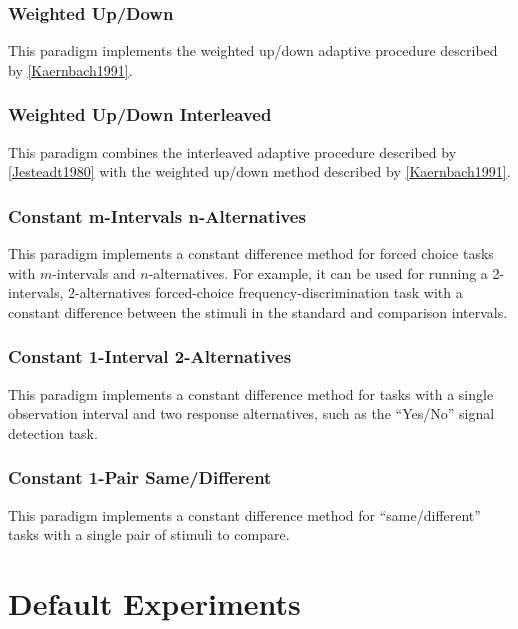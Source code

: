 \documentclass[a4paper,12pt,english]{sphinxmanual}
\begin{document}
\subsection{Weighted Up/Down}
\label{psychophysics:weighted-up-down}
This paradigm implements the weighted up/down adaptive procedure
described by {\hyperref[references:kaernbach1991]{{[}Kaernbach1991{]}}}.


\subsection{Weighted Up/Down Interleaved}
\label{psychophysics:weighted-up-down-interleaved}
This paradigm combines the interleaved adaptive procedure described by {\hyperref[references:jesteadt1980]{{[}Jesteadt1980{]}}} with the weighted up/down method described by {\hyperref[references:kaernbach1991]{{[}Kaernbach1991{]}}}.


\subsection{Constant m-Intervals n-Alternatives}
\label{psychophysics:constant-m-intervals-n-alternatives}
This paradigm implements a constant difference method for forced choice
tasks with $m$-intervals and $n$-alternatives. For example,
it can be used for running a 2-intervals, 2-alternatives forced-choice
frequency-discrimination task with a constant difference between the
stimuli in the standard and comparison intervals.


\subsection{Constant 1-Interval 2-Alternatives}
\label{psychophysics:constant-1-interval-2-alternatives}
This paradigm implements a constant difference method for tasks with a
single observation interval and two response alternatives, such as the
“Yes/No” signal detection task.


\subsection{Constant 1-Pair Same/Different}
\label{psychophysics:constant-1-pair-same-different}
This paradigm implements a constant difference method for
“same/different” tasks with a single pair of stimuli to compare.


\chapter{Default Experiments}
\label{default_experiments:default-experiments}\label{default_experiments::doc}
\end{document}
